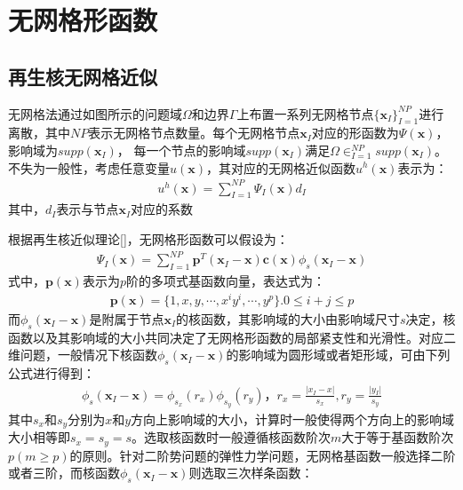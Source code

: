 \documentclass[a4paper]{ctexbook}
\begin{document}
\chapter{无网格形函数}
\section{再生核无网格近似}
无网格法通过如图所示的问题域$\Omega$和边界$\Gamma$上布置一系列无网格节点$\{\pmb{x}_I\}^{N\!P}_{I=1}$进行离散，其中$N\!P$表示无网格节点数量。每个无网格节点$\pmb{x}_I$对应的形函数为$\Psi(\pmb{x})$，影响域为$supp(\pmb{x}_I)$，
每一个节点的影响域$supp(\pmb{x}_I)$满足$\Omega\in^{N\!P}_{I=1}supp(\pmb{x}_I)$。不失为一般性，考虑任意变量$u(\pmb{x})$，其对应的无网格近似函数$u^h(\pmb{x})$表示为：
\begin{equation}
\begin{split}
    u^h(\pmb{x})=\sum_{I=1}^{N\!P}\Psi_I(\pmb{x})d_I
\end{split}
\end{equation}
其中，$d_I$表示与节点$\pmb{x}_I$对应的系数\par
根据再生核近似理论[]，无网格形函数可以假设为：
\begin{equation}\label{shapefunction}
\begin{split}
    \Psi_I(\pmb{x})=\sum_{I=1}^{N\!P}\pmb{p}^T(\pmb{x}_I-\pmb{x})\pmb{c}(\pmb{x})\phi_s(\pmb{x}_I-\pmb{x})
\end{split}
\end{equation}
式中，$\pmb{p}(\pmb{x})$表示为$p$阶的多项式基函数向量，表达式为：
\begin{equation}
\begin{split}
    \pmb{p}(\pmb{x})=\{1,x,y,\dotsb,x^iy^i,\dotsb,y^p\}.0\le i+j \le p
\end{split}
\end{equation}
而$\phi_s(\pmb{x}_I-\pmb{x})$是附属于节点$\pmb{x}_I$的核函数，其影响域的大小由影响域尺寸$s$决定，核函数以及其影响域的大小共同决定了无网格形函数的局部紧支性和光滑性。对应二维问题，一般情况下核函数$\phi_s(\pmb{x}_I-\pmb{x})$的影响域为圆形域或者矩形域，可由下列公式进行得到：
\begin{equation}
\begin{split}
    \phi_s(\pmb{x}_I-\pmb{x})=\phi_{s_x}(r_x)\phi_{s_y}(r_y)，r_x=\frac{\lvert x_I-x\rvert}{s_x},r_y=\frac{\lvert y_I \rvert}{s_y}
\end{split}
\end{equation}
其中$s_x$和$s_y$分别为$x$和$y$方向上影响域的大小，计算时一般使得两个方向上的影响域大小相等即$s_x=s_y=s$。选取核函数时一般遵循核函数阶次$m$大于等于基函数阶次$p(m\ge p)$的原则。针对二阶势问题的弹性力学问题，无网格基函数一般选择二阶或者三阶，而核函数$\phi_s(\pmb{x}_I-\pmb{x})$则选取三次样条函数：
\end{document}
